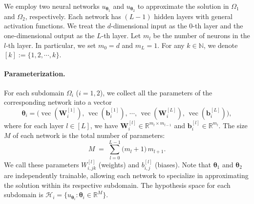 \documentclass{article}
\begin{document}
We employ two neural networks $u_{\boldsymbol{\theta}_1}$ and $u_{\boldsymbol{\theta}_2}$ to approximate the solution in $\Omega_1$ and $\Omega_2$, respectively. Each network has $(L-1)$ hidden layers with general activation functions. We treat the $d$-dimensional input as the 0-th layer and the one-dimensional output as the $L$-th layer. Let $m_l$ be the number of neurons in the $l$-th layer. In particular, we set $m_0 = d$ and $m_L = 1$. For any $k \in \mathbb{N}$, we denote $[k] := \{1,2,\cdots, k\}$.

\paragraph{Parameterization.} 
For each subdomain $\Omega_i$ ($i=1,2$), we collect all the parameters of the corresponding network into a vector 
\[
\boldsymbol{\theta}_i = \bigl(\operatorname{vec}(\boldsymbol{W}_i^{[1]}),\, \operatorname{vec}(\boldsymbol{b}_i^{[1]}),\, \cdots,\,
\operatorname{vec}(\boldsymbol{W}_i^{[L]}),\, \operatorname{vec}(\boldsymbol{b}_i^{[L]})\bigr),
\]
where for each layer $l \in [L]$, we have $\boldsymbol{W}_i^{[l]} \in \mathbb{R}^{m_l \times m_{l-1}}$ and $\boldsymbol{b}_i^{[l]} \in \mathbb{R}^{m_l}$. The size $M$ of each network is the total number of parameters:
\begin{equation}
   M \;=\; \sum_{l=0}^{L-1} \bigl(m_l+1\bigr)\, m_{l+1}.
\end{equation}
We call these parameters $W_{i,jk}^{[l]}$ (weights) and $b_{i,j}^{[l]}$ (biases). Note that $\boldsymbol{\theta}_1$ and $\boldsymbol{\theta}_2$ are independently trainable, allowing each network to specialize in approximating the solution within its respective subdomain. The hypothesis space for each subdomain is $\mathcal{H}_i = \{u_{\boldsymbol{\theta}_i} : \boldsymbol{\theta}_i \in \mathbb{R}^M\}$.
\end{document}
